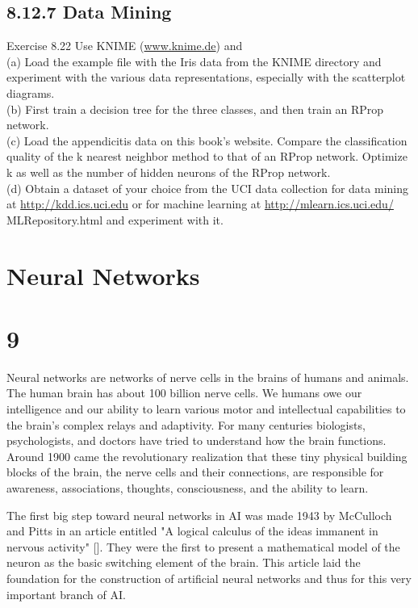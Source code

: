 \documentclass[10pt]{article}
\begin{document}
\subsection*{8.12.7 Data Mining}
Exercise 8.22 Use KNIME (\href{http://www.knime.de}{www.knime.de}) and\\
(a) Load the example file with the Iris data from the KNIME directory and experiment with the various data representations, especially with the scatterplot diagrams.\\
(b) First train a decision tree for the three classes, and then train an RProp network.\\
(c) Load the appendicitis data on this book's website. Compare the classification quality of the k nearest neighbor method to that of an RProp network. Optimize k as well as the number of hidden neurons of the RProp network.\\
(d) Obtain a dataset of your choice from the UCI data collection for data mining at \href{http://kdd.ics.uci.edu}{http://kdd.ics.uci.edu} or for machine learning at \href{http://mlearn.ics.uci.edu/}{http://mlearn.ics.uci.edu/} MLRepository.html and experiment with it.


\section*{Neural Networks}
\section*{9}
Neural networks are networks of nerve cells in the brains of humans and animals. The human brain has about 100 billion nerve cells. We humans owe our intelligence and our ability to learn various motor and intellectual capabilities to the brain's complex relays and adaptivity. For many centuries biologists, psychologists, and doctors have tried to understand how the brain functions. Around 1900 came the revolutionary realization that these tiny physical building blocks of the brain, the nerve cells and their connections, are responsible for awareness, associations, thoughts, consciousness, and the ability to learn.

The first big step toward neural networks in AI was made 1943 by McCulloch and Pitts in an article entitled "A logical calculus of the ideas immanent in nervous activity" [\cite{anderson1988neurocomputing}]. They were the first to present a mathematical model of the neuron as the basic switching element of the brain. This article laid the foundation for the construction of artificial neural networks and thus for this very important branch of AI.
\end{document}
